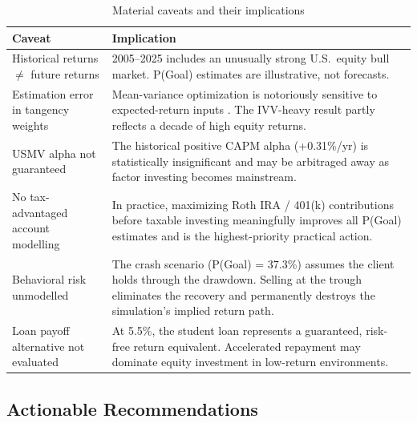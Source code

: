 \documentclass[12pt, letterpaper]{article}
\begin{document}
\begin{table}[H]
  \centering
  \caption{Material caveats and their implications}
  \label{tab:caveats}
  \begin{tabularx}{\linewidth}{lX}
    \toprule
    \textbf{Caveat} & \textbf{Implication} \\
    \midrule
    Historical returns $\neq$ future returns &
      2005--2025 includes an unusually strong U.S.\ equity bull market.
      P(Goal) estimates are illustrative, not forecasts. \\[4pt]
    Estimation error in tangency weights &
      Mean-variance optimization is notoriously sensitive to expected-return inputs
      \citep{michaud1989}.  The IVV-heavy result partly reflects a decade of
      high equity returns. \\[4pt]
    USMV alpha not guaranteed &
      The historical positive CAPM alpha (+0.31\%/yr) is statistically
      insignificant and may be arbitraged away as factor investing becomes mainstream. \\[4pt]
    No tax-advantaged account modelling &
      In practice, maximizing Roth IRA / 401(k) contributions before taxable
      investing meaningfully improves all P(Goal) estimates and is the highest-priority
      practical action. \\[4pt]
    Behavioral risk unmodelled &
      The crash scenario (P(Goal) = 37.3\%) assumes the client holds through the
      drawdown.  Selling at the trough eliminates the recovery and permanently
      destroys the simulation's implied return path. \\[4pt]
    Loan payoff alternative not evaluated &
      At 5.5\%, the student loan represents a guaranteed, risk-free return equivalent.
      Accelerated repayment may dominate equity investment in low-return environments. \\
    \bottomrule
  \end{tabularx}
\end{table}

\subsection{Actionable Recommendations}
\end{document}
